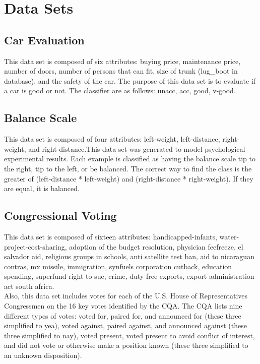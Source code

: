 \documentclass{sig-alternate-05-2015}
\begin{document}
\section{Data Sets}
\subsection{Car Evaluation}
This data set is composed of six attributes: buying price, maintenance price, number of doors, number of persons that can fit, size of trunk (lug\_boot in database), and the safety of the car. The purpose of this data set is to evaluate if a car is good or not. The classifier are as follows: unacc, acc, good, v-good.

\subsection{Balance Scale}
This data set is composed of four attributes: left-weight, left-distance, right-weight, and right-distance.This data set was generated to model psychological experimental results.  Each example is classified as having the
balance scale tip to the right, tip to the left, or be balanced. The correct way to find the class is the greater of (left-distance * left-weight) and (right-distance * right-weight).  If they are equal, it is balanced.

\subsection{Congressional Voting}
This data set is composed of sixteen attributes: handicapped-infants, water-project-cost-sharing, adoption of the budget resolution, physician feefreeze, el salvador aid, religious groups in schools, anti satellite test ban, aid to nicaraguan contras, mx missile, immigration, synfuels corporation cutback, education spending, superfund right to sue, crime, duty free exports, export administration act south africa.\\
\indent Also, this data set includes votes for each of the U.S. House of Representatives Congressmen on the 16 key votes identified by the CQA. The CQA lists nine different types of votes: voted for, paired for, and announced for (these three simplified to yea), voted against, paired against, and announced against (these three simplified to nay), voted present, voted present to avoid conflict of interest, and did not vote or otherwise make a position known (these three simplified to an unknown disposition).
\end{document}
